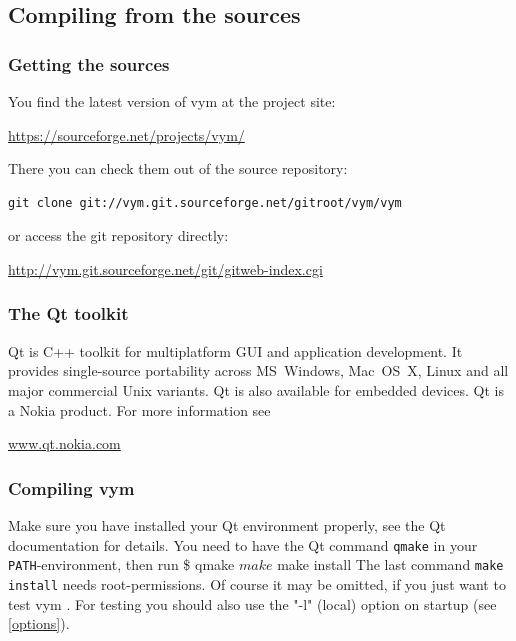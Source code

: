 \documentclass[12pt,a4paper]{article}
\newcommand{\vym}{{\sc vym }}
\newenvironment{code}[1] { \verbatim #1}{\endverbatim  }
\begin{document}
\begin{appendix}
\subsection{Compiling from the sources}
\subsubsection{Getting the sources} \label{getsources}
You find the latest version of \vym at the project site:
\begin{center}
\href{https://sourceforge.net/projects/vym/}{https://sourceforge.net/projects/vym/}
\end{center}
There you can check them out of the source repository:\\

\begin{verbatim}
git clone git://vym.git.sourceforge.net/gitroot/vym/vym
\end{verbatim}
or access the git repository directly:
\begin{center}
\href{http://vym.git.sourceforge.net/git/gitweb-index.cgi}{http://vym.git.sourceforge.net/git/gitweb-index.cgi}
\end{center}

\subsubsection{The Qt toolkit}
Qt is C++ toolkit for multiplatform GUI and application development. It
provides single-source portability across MS~Windows, Mac~OS~X, Linux
and all major commercial Unix variants. Qt is also available for
embedded devices. Qt is a Nokia product. For more information see
\begin{center} 
    \href{http://www.qt.nokia.com}{www.qt.nokia.com} 
\end{center}



\subsubsection{Compiling \vym }
Make sure you have installed your Qt environment properly, see the Qt
documentation for details. You need to have the Qt command {\tt qmake}
in your {\tt PATH}-environment, then run
\begin{code}
\$ qmake
$ make  
$ make install
\end{code}
The last command {\tt make install} needs root-permissions. Of course it
may be omitted, if you just want to test \vym. For testing you should
also use the "-l" (local) option on startup (see \ref{options}).


\end{appendix}
\end{document}
